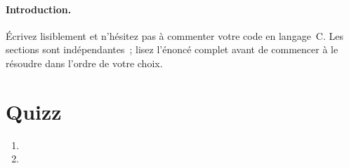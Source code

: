 \documentclass[ds]{sujet}
\begin{document}
\formation{} 
\matiere{}  
\auteur{} 
\paragraph{Introduction.}
\'Ecrivez lisiblement et n'h\'esitez pas \`a commenter votre code en
langage~C. Les sections sont ind\'ependantes~; lisez l'\'enonc\'e
complet avant de commencer \`a le r\'esoudre dans l'ordre de votre
choix.
\section{Quizz}
\begin{enumerate}
\item
\item
\end{enumerate}



\end{document}
